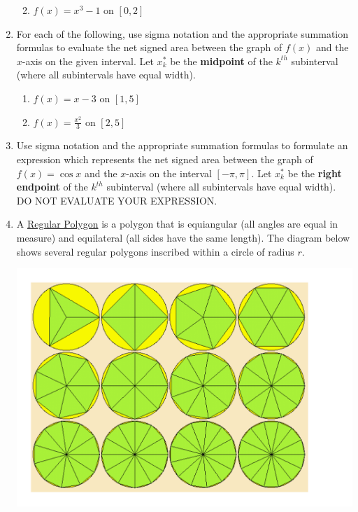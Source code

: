 \documentclass[12pt]{article}
\newif\ifans
\begin{document}
\begin{enumerate}
\begin{enumerate}
\ifans{\fbox{13}} \fi

\item $f(x)=x^3-1$ on $[0,2]$

\ifans{\fbox{2}} \fi

\end{enumerate}

\item For each of the following, use sigma notation and the appropriate summation formulas to evaluate the net signed area between the graph of $f(x)$ and the $x$-axis on the given interval.  Let $x_k^*$ be the {\bf midpoint} of the $k^{th}$ subinterval (where all subintervals have equal width).

\begin{enumerate}

\item $f(x)=x-3$ on $[1,5]$

\ifans{\fbox{0}} \fi

\item $f(x)=\frac{x^2}{3}$ on $[2,5]$

\ifans{\fbox{13}} \fi

\end{enumerate}

\item Use sigma notation and the appropriate summation formulas to formulate an expression which represents the net signed area between the graph of $f(x)=\cos{x}$ and the $x$-axis on the interval $[-\pi,\pi]$.  Let $x_k^*$ be the {\bf right endpoint} of the $k^{th}$ subinterval (where all subintervals have equal width).  DO NOT EVALUATE YOUR EXPRESSION.

\ifans{\fbox{$\sum_{k=1}^n\cos{\left(-\pi+\frac{2\pi}{n}k\right)}\frac{2\pi}{n}$}} \fi

\medskip

\item A \underline{Regular Polygon} is a polygon that is equiangular (all angles are equal in measure) and equilateral (all sides have the same length).  The diagram below shows several regular polygons inscribed within a circle of radius $r$.

\begin{center}

\includegraphics[scale=0.35]{Inscribed.pdf}


\end{center}
\end{enumerate}
\end{document}
